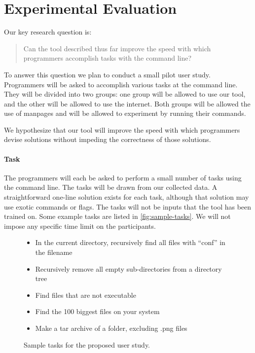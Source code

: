 \section{Experimental Evaluation}

Our key research question is:
%
\begin{quote}
    Can the tool described thus far improve the speed with which programmers
    accomplish tasks with the command line?
\end{quote}
%
To answer this question we plan to conduct a small pilot user study. Programmers
will be asked to accomplish various tasks at the command line. They will be
divided into two groups: one group will be allowed to use our tool, and the
other will be allowed to use the internet. Both groups will be allowed the use
of manpages and will be allowed to experiment by running their commands.

We hypothesize that our tool will improve the speed with which programmers
devise solutions without impeding the correctness of those solutions.

\paragraph{Task} The programmers will each be asked to perform a small number of
tasks using the command line. The tasks will be drawn from our collected data.
A straightforward one-line solution exists for each task, although that solution
may use exotic commands or flags. The tasks will not be inputs that the tool has
been trained on. Some example tasks are listed in \autoref{fig:sample-tasks}. We
will not impose any specific time limit on the participants.

\begin{figure}[ht]
    \begin{framed}
    \begin{itemize}\itemsep-1pt
        \item In the current directory, recursively find all files with ``conf''
            in the filename
        \item Recursively remove all empty sub-directories from a directory tree
        \item Find files that are not executable
        \item Find the 100 biggest files on your system
        \item Make a tar archive of a folder, excluding .png files
    \end{itemize}
    \end{framed}
    \caption{Sample tasks for the proposed user study.}
    \vspace{-10pt}
    \label{fig:sample-tasks}
\end{figure}

